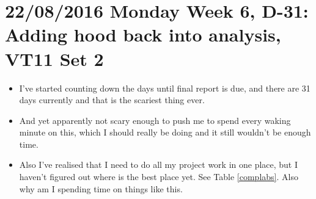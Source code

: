 \documentclass{article}
\begin{document}
\section*{22/08/2016 Monday Week 6, D-31: Adding hood back into analysis, VT11 Set 2}
\begin{itemize}
    \item I've started counting down the days until final report is due, and there are 31 days currently and that is the scariest thing ever.
    \item And yet apparently not scary enough to push me to spend every waking minute on this, which I should really be doing and it still wouldn't be enough time.
    \item Also I've realised that I need to do all my project work in one place, but I haven't figured out where is the best place yet. See Table \ref{complabs}. Also why am I spending time on things like this.
\end{itemize}
\end{document}
